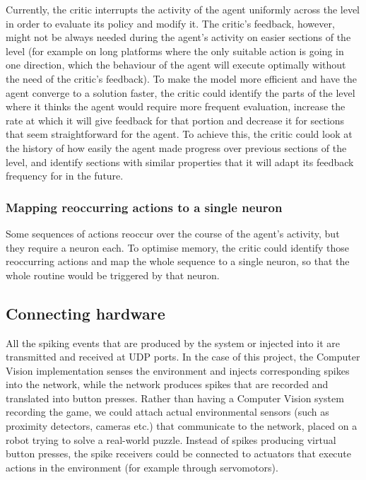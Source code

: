 \documentclass[10pt]{article}
\begin{document}
    Currently, the critic interrupts the activity of the agent uniformly across the level in order to evaluate its policy and modify it. The critic's feedback, however, might not be always needed during the agent's activity on easier sections of the level (for example on long platforms where the only suitable action is going in one direction, which the behaviour of the agent will execute optimally without the need of the critic's feedback). To make the model more efficient and have the agent converge to a solution faster, the critic could identify the parts of the level where it thinks the agent would require more frequent evaluation, increase the rate at which it will give feedback for that portion and decrease it for sections that seem straightforward for the agent. To achieve this, the critic could look at the history of how easily the agent made progress over previous sections of the level, and identify sections with similar properties that it will adapt its feedback frequency for in the future.

    \subsubsection{Mapping reoccurring actions to a single neuron}

    Some sequences of actions reoccur over the course of the agent's activity, but they require a neuron each. To optimise memory, the critic could identify those reoccurring actions and map the whole sequence to a single neuron, so that the whole routine would be triggered by that neuron.

    \subsection{Connecting hardware}

    All the spiking events that are produced by the system or injected into it are transmitted and received at UDP ports. In the case of this project, the Computer Vision implementation senses the environment and injects corresponding spikes into the network, while the network produces spikes that are recorded and translated into button presses. Rather than having a Computer Vision system recording the game, we could attach actual environmental sensors (such as proximity detectors, cameras etc.) that communicate to the network, placed on a robot trying to solve a real-world puzzle. Instead of spikes producing virtual button presses, the spike receivers could be connected to actuators that execute actions in the environment (for example through servomotors).
\end{document}

